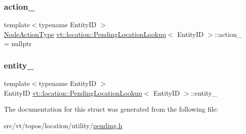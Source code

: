 \subsubsection{\texorpdfstring{action\+\_\+}{action\_}}
{\footnotesize\ttfamily template$<$typename Entity\+ID $>$ \\
\hyperlink{namespacevt_1_1location_a3a9235e0ceb341bef225d2cc46606e9e}{Node\+Action\+Type} \hyperlink{structvt_1_1location_1_1_pending_location_lookup}{vt\+::location\+::\+Pending\+Location\+Lookup}$<$ Entity\+ID $>$\+::action\+\_\+ = nullptr\hspace{0.3cm}{\ttfamily [private]}}

\mbox{\label{structvt_1_1location_1_1_pending_location_lookup_ac35da0e44b6048e6cc893f1498f1aa1d}} 
\subsubsection{\texorpdfstring{entity\+\_\+}{entity\_}}
{\footnotesize\ttfamily template$<$typename Entity\+ID $>$ \\
Entity\+ID \hyperlink{structvt_1_1location_1_1_pending_location_lookup}{vt\+::location\+::\+Pending\+Location\+Lookup}$<$ Entity\+ID $>$\+::entity\+\_\+\hspace{0.3cm}{\ttfamily [private]}}



The documentation for this struct was generated from the following file\+:\begin{DoxyCompactItemize}
\item 
src/vt/topos/location/utility/\hyperlink{pending_8h}{pending.\+h}\end{DoxyCompactItemize}
